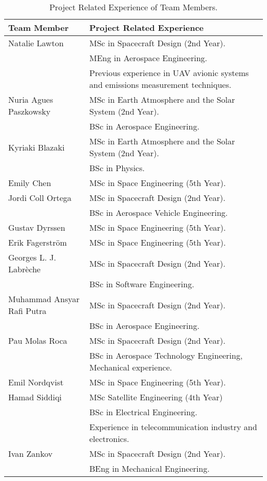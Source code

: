 \begin{table}[H]
\centering
\begin{tabular}{|l|m{11cm}|}
\hline
\textbf{Team Member} & \textbf{Project Related Experience} \\ \hline
Natalie Lawton & MSc in Spacecraft Design (2nd Year). \\& MEng in Aerospace Engineering.\\& Previous experience in UAV avionic systems and emissions measurement techniques. \\ \hline
Nuria Agues Paszkowsky & MSc in Earth Atmosphere and the Solar System (2nd Year). \\& BSc in Aerospace Engineering.\\ \hline
Kyriaki Blazaki & MSc in Earth Atmosphere and the Solar System (2nd Year). \\& BSc in Physics. \\ \hline
Emily Chen & MSc in Space Engineering (5th Year). \\ \hline
Jordi Coll Ortega & MSc in Spacecraft Design (2nd Year). \\& BSc in Aerospace Vehicle Engineering. \\ \hline
Gustav Dyrssen &  MSc in Space Engineering (5th Year).\\ \hline
Erik Fagerström & MSc in Space Engineering (5th Year). \\ \hline
Georges L. J. Labrèche & MSc in Spacecraft Design (2nd Year). \\& BSc in Software Engineering.\\ \hline
Muhammad Ansyar Rafi Putra & MSc in Spacecraft Design (2nd Year). \\& BSc in Aerospace Engineering. \\ \hline
Pau Molas Roca & MSc in Spacecraft Design (2nd Year). \\& BSc in Aerospace Technology Engineering, Mechanical experience. \\ \hline
Emil Nordqvist & MSc in Space Engineering (5th Year). \\ \hline
Hamad Siddiqi & MSc Satellite Engineering (4th Year) \\&  BSc in Electrical Engineering.\\& Experience in telecommunication industry and electronics.  \\ \hline
Ivan Zankov & MSc in Spacecraft Design (2nd Year). \\& BEng in Mechanical Engineering.\\ \hline
\end{tabular}
\caption{Project Related Experience of Team Members.}
\label{tab:team-member-experience}
\end{table}
\raggedbottom